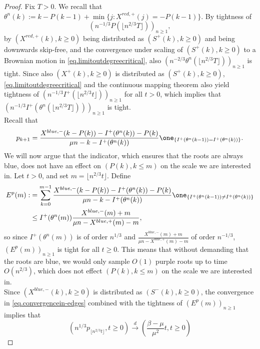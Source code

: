 \begin{proof}
Fix $T>0$. We recall that $\theta^{n}(k):=k-P(k-1)+\min\{j: X^{red,+}(j)=-P(k-1)\}$. By tightness of $$\left(n^{-1/3}P\left(\lfloor  n^{2/3}T\rfloor \right) \right)_{n\geq 1},$$ by $(X^{red,+}(k), k\geq 0)$ being distributed as $(S^+(k),k\geq 0)$ and being downwards skip-free, and the convergence under scaling of $(S^+(k),k\geq 0)$ to a Brownian motion in \eqref{eq.limitoutdegreecritical}, also $\left(n^{-2/3}\theta^{n}(\lfloor n^{2/3}T\rfloor )\right)_{n\geq 1}$ is tight.  Since also $(X^+(k),k\geq 0)$ is distributed as $(S^+(k),k\geq 0)$, \eqref{eq.limitoutdegreecritical} and the continuous mapping theorem also yield tightness of $\left(n^{-1/3}I^+(\lfloor n^{2/3} t \rfloor)\right)_{n\geq 1}$ for all $t>0$, which implies that $\left(n^{-1/3}I^+(\theta^{n}(\lfloor n^{2/3} T \rfloor))\right)_{n\geq 1}$ is tight. \\
Recall that
$$p_{k+1}=\frac{X^{blue,-}(k-P(k))-I^+(\theta^{n}(k))-P(k)}{\mu n-k-I^+(\theta^{n}(k))}\one_{\left\{I^+(\theta^n(k-1))= I^+(\theta^n(k))\right\}}.$$
We will now argue that the indicator, which ensures that the roots are always blue, does not have an effect on $(P(k),k\leq m)$ on the scale we are interested in. Let $t>0$, and set $m=\lfloor n^{2/3}t\rfloor$. Define
\begin{align*}\begin{split}
E^p(m):&=\sum_{k=0}^{m-1} \frac{X^{blue,-}(k-P(k))-I^+(\theta^{n}(k))-P(k)}{\mu n-k-I^+(\theta^{n}(k))}\one_{\left\{I^+(\theta^n(k-1))\neq I^+(\theta^n(k))\right\}}\\
&\leq I^+(\theta^n(m)) \frac{X^{blue,-}(m)+m}{\mu n-X^{blue,+}(m)-m},\end{split}\end{align*}
so since $I^+(\theta^n(m))$ is of order $n^{1/3}$ and $\frac{X^{blue,-}(m)+m}{\mu n-X^{blue,+}(m)-m}$ of order $n^{-1/3}$, $(E^p(m))_{n\geq 1}$ is tight for all $t\geq 0$.  This means that without demanding that the roots are blue, we would only sample $O(1)$ purple roots up to time $O(n^{2/3})$, which does not effect $(P(k),k\leq m)$ on the scale we are interested in. \\
 Since $(X^{blue,-}(k),k\geq 0)$ is distributed as $(S^-(k),k\geq 0)$, the convergence in \eqref{eq.convergencein-edges} combined with the tightness of $(E^p(m))_{n\geq 1}$ implies that
\begin{equation}\label{eq.convergenceprob}\left(n^{1/3}p_{\lfloor n^{2/3} t \rfloor},t\geq 0\right)\overset{d}{\to} \left(\frac{\beta-\mu}{\mu^2}t,t\geq 0\right)\end{equation}

\end{proof}
